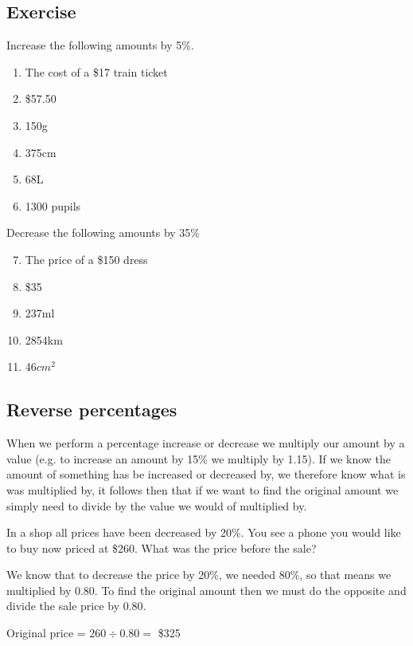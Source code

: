 \subsection{Exercise}
Increase the following amounts by 5\%.
\begin{enumerate}
	\item The cost of a \$17 train ticket
	\item \$57.50
	\item 150g
	\item 375cm
	\item 68L
	\item 1300 pupils
\end{enumerate}
Decrease the following amounts by 35\%
\begin{enumerate}
	\setcounter{enumi}{6}
	\item The price of a \$150 dress
	\item \$35
	\item 237ml
	\item 2854km
	\item 46$cm^2$
\end{enumerate}

\subsection{Reverse percentages}
When we perform a percentage increase or decrease we multiply our amount by a value (e.g. to increase an amount by 15\% we multiply by 1.15).  If we know the amount of something has be increased or decreased by, we therefore know what is was multiplied by, it follows then that if we want to find the original amount we simply need to divide by the value we would of multiplied by.
\begin{exmp}
	In a shop all prices have been decreased by 20\%.  You see a phone you would like to buy now priced at \$260.  What was the price before the sale?
	
	We know that to decrease the price by 20\%, we needed 80\%, so that means we multiplied by 0.80.  To find the original amount then we must do the opposite and divide the sale price by 0.80.
	
	Original price = $260 \div 0.80 = $ \$325
\end{exmp}
